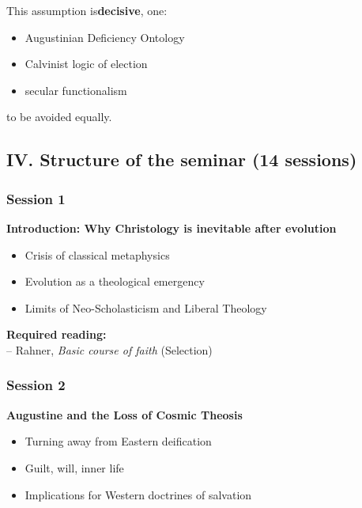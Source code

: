 \documentclass[
]{article}
\begin{document}
This assumption is\textbf{decisive}, one:

\begin{itemize}
\item
  Augustinian Deficiency Ontology
\item
  Calvinist logic of election
\item
  secular functionalism
\end{itemize}

to be avoided equally.

\subsection{\texorpdfstring{\textbf{IV. Structure of the seminar (14 sessions)}}{IV. Structure of the seminar (14 sessions)}}\label{iv.-structure-of-the-seminar-14-sessions}

\subsubsection{\texorpdfstring{\textbf{Session 1}}{Session 1}}\label{session-1}

\textbf{Introduction: Why Christology is inevitable after evolution}

\begin{itemize}
\item
  Crisis of classical metaphysics
\item
  Evolution as a theological emergency
\item
  Limits of Neo-Scholasticism and Liberal Theology
\end{itemize}

\textbf{Required reading:\\
}-- Rahner, \emph{Basic course of faith} (Selection)

\subsubsection{\texorpdfstring{\textbf{Session 2}}{Session 2}}\label{session-2}

\textbf{Augustine and the Loss of Cosmic Theosis}

\begin{itemize}
\item
  Turning away from Eastern deification
\item
  Guilt, will, inner life
\item
  Implications for Western doctrines of salvation
\end{itemize}
\end{document}
